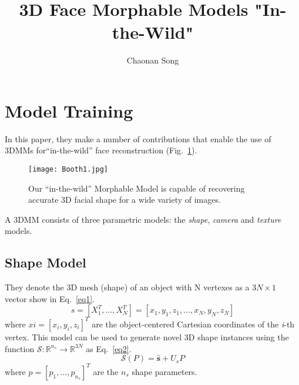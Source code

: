 \documentclass[twocolumn]{article}
\author{Chaonan Song}
\title{3D Face Morphable Models "In-the-Wild"}
\begin{document}
        \maketitle
        \section{Model Training}
        In this paper, they make a number of contributions that enable the use of 3DMMs for``in-the-wild'' face reconstruction
        (Fig.~\ref{fig1}).
        \begin{figure}[H]
            \centering
            \texttt{[image: Booth1.jpg]}
            \caption{Our ``in-the-wild'' Morphable Model is capable of recovering accurate 3D facial shape for a wide 
            variety of images.}
            \label{fig1}
\end{figure}
        A 3DMM consists of three parametric models: the \emph{shape}, \emph{camera} and \emph{texture} models.
        \subsection{Shape Model}
        They denote the 3D mesh (shape) of an object with N vertexes as a $3N \times 1$ vector show in Eq.~\ref{eq1}.
        \begin{equation}
        s = \left[
        X_{1}^{T}, \dots, X_{N}^{T} \right] = \left[x_1, y_1, z_1, \dots, x_N, y_N, z_N \right]
        \label{eq1}
        \end{equation}
        where $xi = \left[x_i, y_i, z_i\right]^T$ are the object-centered Cartesian coordinates of the \emph{i}-th vertex. This model can be used to generate novel 3D shape instances using the function $\mathcal{S}: \mathbb{R}^{n_s} \to \mathbb{R}^{3N}$ as Eq.~\ref{eq2}.
        \begin{equation}
        \mathcal{S}(P) = \hat{\mathbf{s}} + U_{s}P
        \label{eq2}
        \end{equation}
        where $p = \left[p_1,\dots , p_{n_s} \right]^T$ are the $n_s$ shape parameters.
\end{document}
